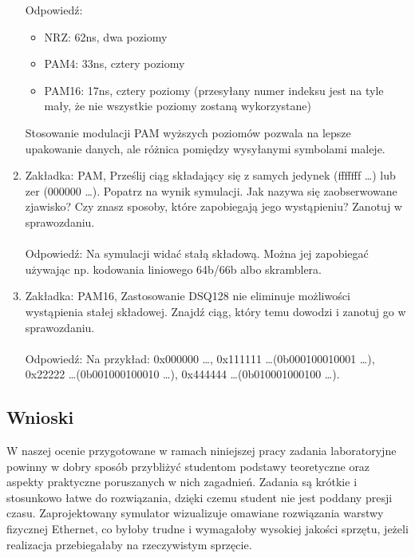 \begin{enumerate}
    Odpowiedź:
    \begin{itemize}
        \item NRZ: 62ns, dwa poziomy
        \item PAM4: 33ns, cztery poziomy
        \item PAM16: 17ns, cztery poziomy (przesyłany numer indeksu jest na tyle mały, że nie wszystkie poziomy zostaną wykorzystane)
    \end{itemize} 
    Stosowanie modulacji PAM wyższych poziomów pozwala na lepsze upakowanie danych, ale różnica pomiędzy wysyłanymi symbolami maleje.
    \item Zakładka: PAM, Prześlij ciąg składający się z samych jedynek (fffffff \dots) lub zer (000000 \dots). Popatrz na wynik symulacji. Jak nazywa się zaobserwowane zjawisko? Czy znasz sposoby,
    które zapobiegają jego wystąpieniu? Zanotuj w sprawozdaniu. \\ \\
    Odpowiedź: Na symulacji widać stałą składową. Można jej zapobiegać używając np. kodowania liniowego 64b/66b albo skramblera.
    \item Zakładka: PAM16, Zastosowanie DSQ128 nie eliminuje możliwości wystąpienia stałej składowej. Znajdź ciąg, który
    temu dowodzi i zanotuj go w sprawozdaniu. \\ \\
    Odpowiedź: Na przykład: 0x000000 \dots, 0x111111 \dots (0b000100010001 \dots),\\0x22222 \dots (0b001000100010 \dots),
    0x444444 \dots (0b010001000100 \dots).
\end{enumerate}

\subsection*{Wnioski}

W naszej ocenie przygotowane w ramach niniejszej pracy zadania laboratoryjne powinny w dobry sposób przybliżyć studentom podstawy
teoretyczne oraz aspekty praktyczne poruszanych w nich zagadnień. Zadania są krótkie i stosunkowo łatwe do rozwiązania, dzięki czemu
student nie jest poddany presji czasu. Zaprojektowany symulator wizualizuje omawiane rozwiązania warstwy fizycznej Ethernet, co byłoby
trudne i wymagałoby wysokiej jakości sprzętu, jeżeli realizacja przebiegałaby na rzeczywistym sprzęcie.
